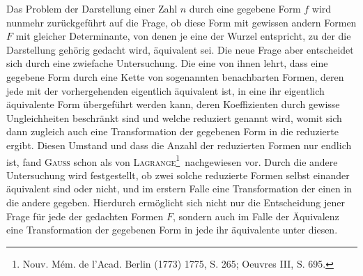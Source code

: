 Das Problem der Darstellung einer Zahl \(n\) durch eine gegebene Form \(f\) wird nunmehr zurückgeführt auf die Frage, ob diese Form mit gewissen andern Formen \(F\) mit gleicher Determinante, von denen je eine der Wurzel entspricht, zu der die Darstellung gehörig gedacht wird, äquivalent sei. Die neue Frage aber entscheidet sich durch eine zwiefache Untersuchung. Die eine von ihnen lehrt, dass eine gegebene Form durch eine Kette von sogenannten benachbarten Formen, deren jede mit der vorhergehenden eigentlich äquivalent ist, in eine ihr eigentlich äquivalente Form übergeführt werden kann, deren Koeffizienten durch gewisse Ungleichheiten beschränkt sind und welche reduziert genannt wird,
\newpage{}
\noindent womit sich dann zugleich auch eine Transformation der gegebenen Form in die reduzierte ergibt. Diesen Umstand und dass die Anzahl der reduzierten Formen nur endlich ist, fand \textsc{Gauss} schon als von \textsc{Lagrange}\footnote{Nouv. Mém. de l’Acad. Berlin (1773) 1775, S. 265; Oeuvres III, S. 695.}\ nachgewiesen vor. Durch die andere Untersuchung wird festgestellt, ob zwei solche reduzierte Formen selbst einander äquivalent sind oder nicht, und im erstern Falle eine Transformation der einen in die andere gegeben. Hierdurch ermöglicht sich nicht nur die Entscheidung jener Frage für jede der gedachten Formen \(F\), sondern auch im Falle der Äquivalenz eine Transformation der gegebenen Form in jede ihr äquivalente unter diesen.

